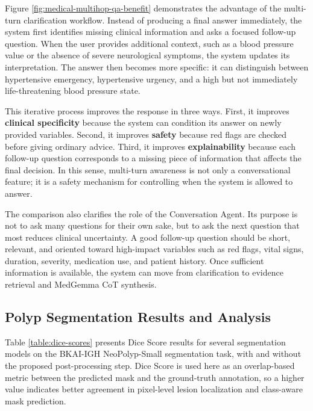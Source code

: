 Figure \ref{fig:medical-multihop-qa-benefit} demonstrates the advantage of the multi-turn clarification workflow. Instead of producing a final answer immediately, the system first identifies missing clinical information and asks a focused follow-up question. When the user provides additional context, such as a blood pressure value or the absence of severe neurological symptoms, the system updates its interpretation. The answer then becomes more specific: it can distinguish between hypertensive emergency, hypertensive urgency, and a high but not immediately life-threatening blood pressure state.

This iterative process improves the response in three ways. First, it improves \textbf{clinical specificity} because the system can condition its answer on newly provided variables. Second, it improves \textbf{safety} because red flags are checked before giving ordinary advice. Third, it improves \textbf{explainability} because each follow-up question corresponds to a missing piece of information that affects the final decision. In this sense, multi-turn awareness is not only a conversational feature; it is a safety mechanism for controlling when the system is allowed to answer.

The comparison also clarifies the role of the Conversation Agent. Its purpose is not to ask many questions for their own sake, but to ask the next question that most reduces clinical uncertainty. A good follow-up question should be short, relevant, and oriented toward high-impact variables such as red flags, vital signs, duration, severity, medication use, and patient history. Once sufficient information is available, the system can move from clarification to evidence retrieval and MedGemma CoT synthesis.


\subsection{Polyp Segmentation Results and Analysis}

Table \ref{table:dice-scores} presents Dice Score results for several segmentation models on the BKAI-IGH NeoPolyp-Small segmentation task, with and without the proposed post-processing step. Dice Score is used here as an overlap-based metric between the predicted mask and the ground-truth annotation, so a higher value indicates better agreement in pixel-level lesion localization and class-aware mask prediction.

